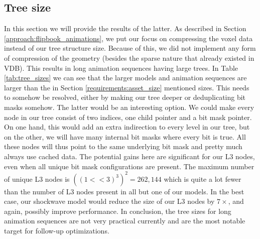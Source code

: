 \subsection{Tree size} \label{results:tree_size}
In this section we will provide the results of the latter. As described in Section \ref{approach:flipbook_animations}, we put our focus on compressing the voxel data instead of our tree structure size. Because of this, we did not implement any form of compression of the geometry (besides the sparse nature that already existed in VDB). This results in long animation sequences having large trees. In Table \ref{tab:tree_sizes} we can see that the larger models and animation sequences are larger than the in Section \ref{requirements:asset_size} mentioned sizes. This needs to somehow be resolved, either by making our tree deeper or deduplicating bit masks somehow. The latter would be an interesting option. We could make every node in our tree consist of two indices, one child pointer and a bit mask pointer. On one hand, this would add an extra indirection to every level in our tree, but on the other, we will have many internal bit masks where every bit is true. All these nodes will thus point to the same underlying bit mask and pretty much always use cached data. The potential gains here are significant for our L3 nodes, even when all unique bit mask configurations are present. The maximum number of unique L3 nodes is $((1<<3)^3)^2 = 262,144$ which is quite a lot fewer than the number of L3 nodes present in all but one of our models. In the best case, our shockwave model would reduce the size of our L3 nodes by $7\times$, and again, possibly improve performance. In conclusion, the tree sizes for long animation sequences are not very practical currently and are the most notable target for follow-up optimizations.

